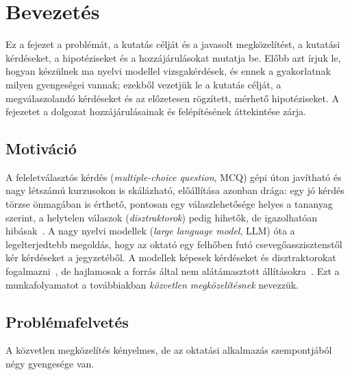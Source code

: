 \chapter{Bevezetés}
\label{ch:bevezetes}

Ez a fejezet a problémát, a kutatás célját és a javasolt megközelítést, a kutatási kérdéseket, a
hipotéziseket és a hozzájárulásokat mutatja be. Előbb azt írjuk le, hogyan készülnek ma nyelvi modellel
vizsgakérdések, és ennek a gyakorlatnak milyen gyengeségei vannak; ezekből vezetjük le a kutatás célját, a
megválaszolandó kérdéseket és az előzetesen rögzített, mérhető hipotéziseket. A fejezetet a dolgozat
hozzájárulásainak és felépítésének áttekintése zárja.

\section{Motiváció}

A feleletválasztós kérdés (\emph{multiple-choice question}, MCQ) gépi úton javítható és nagy létszámú
kurzusokon is skálázható, előállítása azonban drága: egy jó kérdés törzse önmagában is érthető, pontosan egy
válaszlehetősége helyes a tananyag szerint, a helytelen válaszok (\emph{disztraktorok}) pedig hihetők, de
igazolhatóan hibásak~\cite{haladyna2002review,gierl2017distractors}. A nagy nyelvi modellek (\emph{large language
model}, LLM) óta a legelterjedtebb megoldás, hogy az oktató egy felhőben futó csevegőasszisztenstől kér
kérdéseket a jegyzetéből. A modellek képesek kérdéseket és disztraktorokat fogalmazni~\cite{kurdi2020systematic},
de hajlamosak a forrás által nem alátámasztott állításokra~\cite{ji2023hallucination}. Ezt a munkafolyamatot a
továbbiakban \emph{közvetlen megközelítésnek} nevezzük.

\section{Problémafelvetés}
\label{sec:problemaf}

A közvetlen megközelítés kényelmes, de az oktatási alkalmazás szempontjából négy gyengesége van.

